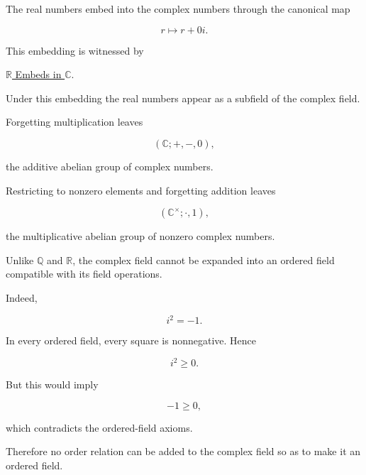 \begin{remark*}

The real numbers embed into the complex numbers through the canonical map

\[
r
\longmapsto
r+0i.
\]

This embedding is witnessed by

\hyperref[thm:r-embeds-in-c]
{$\mathbb R$ Embeds in $\mathbb C$}.

Under this embedding the real numbers appear as a subfield of the complex
field.

\end{remark*}


\begin{remark*}

Forgetting multiplication leaves

\[
(\mathbb C;+,-,0),
\]

the additive abelian group of complex numbers.

\end{remark*}

\begin{remark*}

Restricting to nonzero elements and forgetting addition leaves

\[
(\mathbb C^\times;\cdot,1),
\]

the multiplicative abelian group of nonzero complex numbers.

\end{remark*}


\begin{remark*}

Unlike $\mathbb Q$ and $\mathbb R$, the complex field cannot be expanded into
an ordered field compatible with its field operations.

Indeed,

\[
i^2=-1.
\]

In every ordered field, every square is nonnegative. Hence

\[
i^2 \ge 0.
\]

But this would imply

\[
-1 \ge 0,
\]

which contradicts the ordered-field axioms.

Therefore no order relation can be added to the complex field so as to make it
an ordered field.

\end{remark*}


